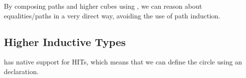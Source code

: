 
By composing paths and higher cubes using , we can reason
about equalities/paths in a very direct way, avoiding the use of path
induction.

\subsection{Higher Inductive Types}
\label{sec:hits}

\CubicalAgda has native support for HITs, which means that we
can define the circle using an \Agda~ declaration.


